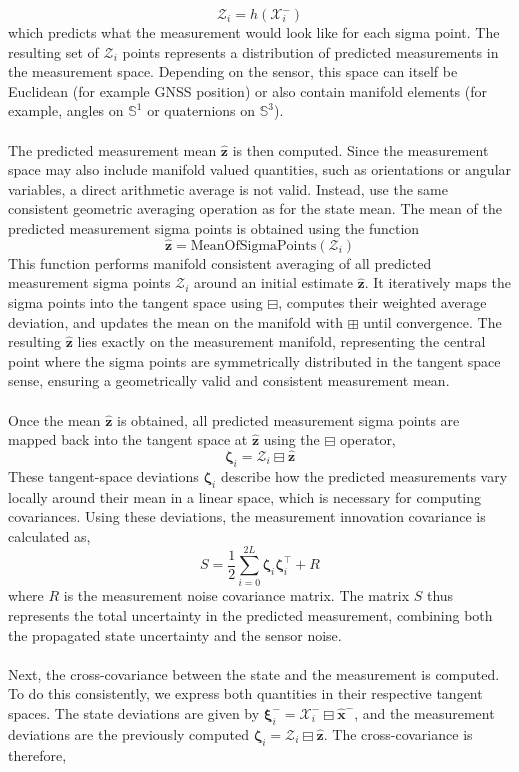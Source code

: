 $$
    \mathcal{Z}_i = h(\mathcal{X}_i^-)
$$
which predicts what the measurement would look like for each sigma point. The resulting set of $\mathcal{Z}_i$ points represents a distribution of predicted measurements in the measurement space. Depending on the sensor, this space can itself be Euclidean (for example GNSS position) or also contain manifold elements (for example, angles on $\mathbb{S}^1$ or quaternions on $\mathbb{S}^3$).  
\\ \\
The predicted measurement mean $\hat{\mathbf{z}}$ is then computed. Since the measurement space may also include manifold valued quantities, such as orientations or angular variables, a direct arithmetic average is not valid. Instead, use the same consistent geometric averaging operation as for the state mean. The mean of the predicted measurement sigma points is obtained using the function
$$
    \hat{\mathbf{z}} = \text{MeanOfSigmaPoints}(\mathcal{Z}_i)
$$
This function performs manifold consistent averaging of all predicted measurement sigma points $\mathcal{Z}_i$ around an initial estimate $\hat{\mathbf{z}}$. It iteratively maps the sigma points into the tangent space using $\boxminus$, computes their weighted average deviation, and updates the mean on the manifold with $\boxplus$ until convergence. The resulting $\hat{\mathbf{z}}$ lies exactly on the measurement manifold, representing the central point where the sigma points are symmetrically distributed in the tangent space sense, ensuring a geometrically valid and consistent measurement mean.
\\ \\
Once the mean $\hat{\mathbf{z}}$ is obtained, all predicted measurement sigma points are mapped back into the tangent space at $\hat{\mathbf{z}}$ using the $\boxminus$ operator,  
$$
    \boldsymbol{\zeta}_i = \mathcal{Z}_i \boxminus \hat{\mathbf{z}}
$$
These tangent-space deviations $\boldsymbol{\zeta}_i$ describe how the predicted measurements vary locally around their mean in a linear space, which is necessary for computing covariances. Using these deviations, the measurement innovation covariance is calculated as,  
$$
    S = \frac{1}{2} \sum_{i=0}^{2L} \boldsymbol{\zeta}_i \boldsymbol{\zeta}_i^\top + R
$$
where $R$ is the measurement noise covariance matrix. The matrix $S$ thus represents the total uncertainty in the predicted measurement, combining both the propagated state uncertainty and the sensor noise.  
\\ \\
Next, the cross-covariance between the state and the measurement is computed. To do this consistently, we express both quantities in their respective tangent spaces. The state deviations are given by $\boldsymbol{\xi}_i^- = \mathcal{X}_i^- \boxminus \hat{\mathbf{x}}^-$, and the measurement deviations are the previously computed $\boldsymbol{\zeta}_i = \mathcal{Z}_i \boxminus \hat{\mathbf{z}}$. The cross-covariance is therefore,  
